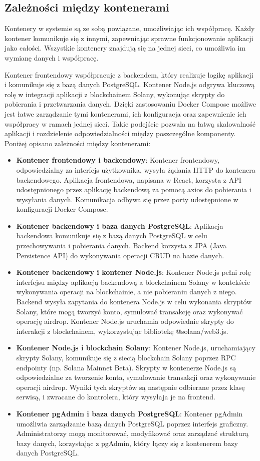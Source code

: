 \subsection{Zależności między kontenerami}
Kontenery w systemie są ze sobą powiązane, umożliwiając ich współpracę. Każdy kontener komunikuje się z innymi, zapewniając sprawne funkcjonowanie aplikacji jako całości. Wszystkie kontenery znajdują się na jednej sieci, co umożliwia im wymianę danych i współpracę. 

Kontener frontendowy współpracuje z backendem, który realizuje logikę aplikacji i komunikuje się z bazą danych PostgreSQL. Kontener Node.js odgrywa kluczową rolę w integracji aplikacji z blockchainem Solany, wykonując skrypty do pobierania i przetwarzania danych. Dzięki zastosowaniu Docker Compose możliwe jest łatwe zarządzanie tymi kontenerami, ich konfiguracja oraz zapewnienie ich współpracy w ramach jednej sieci. Takie podejście pozwala na łatwą skalowalność aplikacji i rozdzielenie odpowiedzialności między poszczególne komponenty. Poniżej opisano zależności między kontenerami:
\begin{itemize}
    \item \textbf{Kontener frontendowy i backendowy}: Kontener frontendowy, odpowiedzialny za interfejs użytkownika, wysyła żądania HTTP do kontenera backendowego. Aplikacja frontendowa, napisana w React, korzysta z API udostępnionego przez aplikację backendową za pomocą axios do pobierania i wysyłania danych. Komunikacja odbywa się przez porty udostępnione w konfiguracji Docker Compose.
    \item \textbf{Kontener backendowy i baza danych PostgreSQL}: Aplikacja backendowa komunikuje się z bazą danych PostgreSQL w celu przechowywania i pobierania danych. Backend korzysta z JPA (Java Persistence API) do wykonywania operacji CRUD na bazie danych.
    \item \textbf{Kontener backendowy i kontener Node.js}: Kontener Node.js pełni rolę interfejsu między aplikacją backendową a blockchainem Solany w kontekście wykonywania operacji na blockchainie, a nie pobieraniu danych z niego. Backend wysyła zapytania do kontenera Node.js w celu wykonania skryptów Solany, które mogą tworzyć konto, symulować transakcję oraz wykonywać operację airdrop. Kontener Node.js uruchamia odpowiednie skrypty do interakcji z blockchainem, wykorzystując bibliotekę @solana/web3.js.
    \item \textbf{Kontener Node.js i blockchain Solany}: Kontener Node.js, uruchamiający skrypty Solany, komunikuje się z siecią blockchain Solany poprzez RPC endpointy (np. Solana Mainnet Beta). Skrypty w kontenerze Node.js są odpowiedzialne za tworzenie konta, symulowanie transakcji oraz wykonywanie operacji airdrop. Wyniki tych skryptów są następnie odbierane przez klasę serwisą, i zwracane do kontrolera, który wysyłaja je na frontend.
    \item \textbf{Kontener pgAdmin i baza danych PostgreSQL}: Kontener pgAdmin umożliwia zarządzanie bazą danych PostgreSQL poprzez interfejs graficzny. Administratorzy mogą monitorować, modyfikować oraz zarządzać strukturą bazy danych, korzystając z pgAdmin, który łączy się z kontenerem bazy danych PostgreSQL.
\end{itemize}


